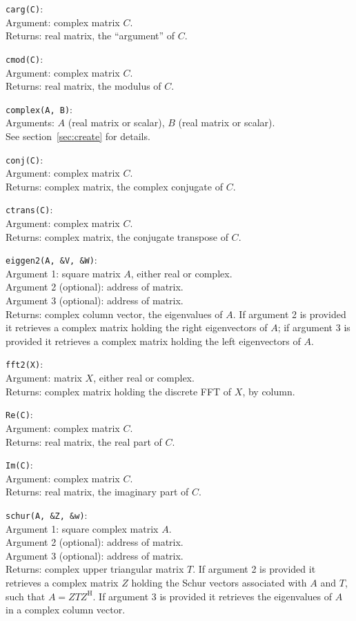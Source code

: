 \documentclass{article}
\begin{document}
\texttt{carg(C)}:\\
Argument: complex matrix $C$.\\
Returns: real matrix, the ``argument'' of $C$.

\texttt{cmod(C)}:\\
Argument: complex matrix $C$.\\
Returns: real matrix, the modulus of $C$.

\texttt{complex(A, B)}:\\
Arguments: $A$ (real matrix or scalar), $B$ (real matrix or scalar).\\
See section~\ref{sec:create} for details.

\texttt{conj(C)}:\\
Argument: complex matrix $C$.\\
Returns: complex matrix, the complex conjugate of $C$.

\texttt{ctrans(C)}:\\
Argument: complex matrix $C$.\\
Returns: complex matrix, the conjugate transpose of $C$.

\texttt{eiggen2(A, \&V, \&W)}:\\
Argument 1: square matrix $A$, either real or complex.\\
Argument 2 (optional): address of matrix.\\
Argument 3 (optional): address of matrix.\\
Returns: complex column vector, the eigenvalues of $A$. If argument 2
is provided it retrieves a complex matrix holding the right
eigenvectors of $A$; if argument 3 is provided it retrieves a complex
matrix holding the left eigenvectors of $A$.

\texttt{fft2(X)}:\\
Argument: matrix $X$, either real or complex.\\
Returns: complex matrix holding the discrete FFT of $X$, by
column.

\texttt{Re(C)}:\\
Argument: complex matrix $C$.\\
Returns: real matrix, the real part of $C$.

\texttt{Im(C)}:\\
Argument: complex matrix $C$.\\
Returns: real matrix, the imaginary part of $C$.

\texttt{schur(A, \&Z, \&w)}:\\
Argument 1: square complex matrix $A$.\\
Argument 2 (optional): address of matrix.\\
Argument 3 (optional): address of matrix.\\
Returns: complex upper triangular matrix $T$. If argument 2 is
provided it retrieves a complex matrix $Z$ holding the Schur vectors
associated with $A$ and $T$, such that $A = ZTZ^{\mathrm H}$. If
argument 3 is provided it retrieves the eigenvalues of $A$ in
a complex column vector.
\end{document}
